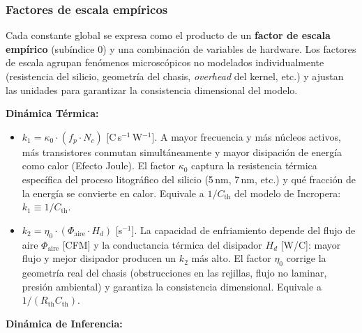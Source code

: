 \documentclass[10pt, twocolumn]{article}
\begin{document}
\subsubsection{Factores de escala empíricos}

Cada constante global se expresa como el producto de un \textbf{factor de escala
empírico} (subíndice $0$) y una combinación de variables de hardware. Los factores
de escala agrupan fenómenos microscópicos no modelados individualmente (resistencia
del silicio, geometría del chasis, \emph{overhead} del kernel, etc.) y ajustan las
unidades para garantizar la consistencia dimensional del modelo.

\medskip
\noindent\textbf{Dinámica Térmica:}

\begin{itemize}
  \item $k_1 = \kappa_0 \cdot (f_p \cdot N_c)$ [\textdegree C\,s$^{-1}$\,W$^{-1}$].
        A mayor frecuencia y más núcleos activos, más transistores conmutan
        simultáneamente y mayor disipación de energía como calor (Efecto Joule).
        El factor $\kappa_0$ captura la resistencia térmica específica del proceso
        litográfico del silicio (5\,nm, 7\,nm, etc.) y qué fracción de la energía
        se convierte en calor. Equivale a $1/C_{\text{th}}$ del modelo de
        Incropera: $k_1 \equiv 1/C_{\text{th}}$.

  \item $k_2 = \eta_0 \cdot (\Phi_{\text{aire}} \cdot H_d)$ [s$^{-1}$].
        La capacidad de enfriamiento depende del flujo de aire
        $\Phi_{\text{aire}}$ [CFM] y la conductancia térmica del disipador $H_d$
        [W/\textdegree C]: mayor flujo y mejor disipador producen un $k_2$ más alto.
        El factor $\eta_0$ corrige la geometría real del chasis (obstrucciones en
        las rejillas, flujo no laminar, presión ambiental) y garantiza la
        consistencia dimensional. Equivale a $1/(R_{\text{th}} C_{\text{th}})$.
\end{itemize}

\noindent\textbf{Dinámica de Inferencia:}
\end{document}
